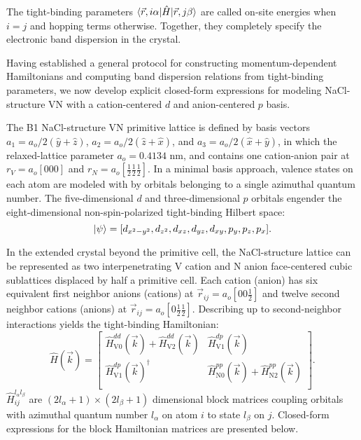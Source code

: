 \documentclass[twocolumn,showpacs,preprintnumbers,superscriptaddress,prb,floatfix,aps,10pt]{revtex4-1}
\newcommand*{\ham}{\hat{H}}
\newcommand*{\bondvec}{\vec{r}_{ij}}
\begin{document}
The tight-binding parameters $\braket{\vec{r},i\alpha | \ham | \vec{r},j\beta}$ are called on-site energies when $i=j$ and hopping terms otherwise. Together, they completely specify the electronic band dispersion in the crystal.  



Having established a general protocol for constructing momentum-dependent Hamiltonians and computing band dispersion relations from tight-binding parameters, we now develop explicit closed-form expressions for modeling NaCl-structure VN with a cation-centered $d$ and anion-centered $p$ basis. 

The B1 NaCl-structure VN primitive lattice is defined by basis vectors $a_1 = a_o/2 (\hat{y} + \hat{z})$, $a_2 = a_o/2 (\hat{z} + \hat{x})$, and $a_3 = a_o/2 (\hat{x} + \hat{y})$, in which the relaxed-lattice parameter $a_o = 0.4134$ nm, and contains one cation-anion pair at $r_V = a_o[000]$ and $r_N = a_o[\frac{1}{2}\frac{1}{2}\frac{1}{2}]$. In a minimal basis approach, valence states on each atom are modeled with by orbitals belonging to a single azimuthal quantum number. The five-dimensional $d$ and three-dimensional $p$ orbitals engender the eight-dimensional non-spin-polarized tight-binding Hilbert space:
\begin{equation}
\label{eq:hilbert}
\ket{\psi} =
[ d_{x^2-y^2},
  d_{z^2}, 
  d_{xz},
  d_{yz},
  d_{xy},
  p_{y},
  p_{z},
  p_{x}] .
\end{equation}

In the extended crystal beyond the primitive cell, the NaCl-structure lattice can be represented as two interpenetrating V cation and N anion face-centered cubic sublattices displaced by half a primitive cell. Each cation (anion) has six equivalent first neighbor anions (cations) at $\bondvec = a_o [0 0 \frac{1}{2}]$ and twelve second neighbor cations (anions) at $\bondvec = a_o[0 \frac{1}{2} \frac{1}{2}]$. Describing up to second-neighbor interactions yields the tight-binding Hamiltonian:
%
\begin{equation}
\label{eq:ham_explicit}
\ham(\vec{k}) = 
\begin{bmatrix}
\ham_{\textrm{V}0}^{dd}(\vec{k}) + \ham_{\textrm{V}2}^{dd}(\vec{k}) &\ham_{\textrm{V}1}^{dp}(\vec{k}) \\
\ham_{\textrm{V}1}^{dp}(\vec{k})^{\dagger} & \ham_{\textrm{N}0}^{pp}(\vec{k}) + \ham_{\textrm{N}2}^{pp}(\vec{k}) \\
\end{bmatrix} .
\end{equation}
%
$\ham_{ij}^{l_\alpha l_\beta}$ are $(2l_\alpha+1)\times(2l_\beta+1)$ dimensional block matrices coupling orbitals with azimuthal quantum number $l_\alpha$ on atom $i$ to state $l_\beta$ on $j$. Closed-form expressions for the block Hamiltonian matrices are presented below.
\end{document}

